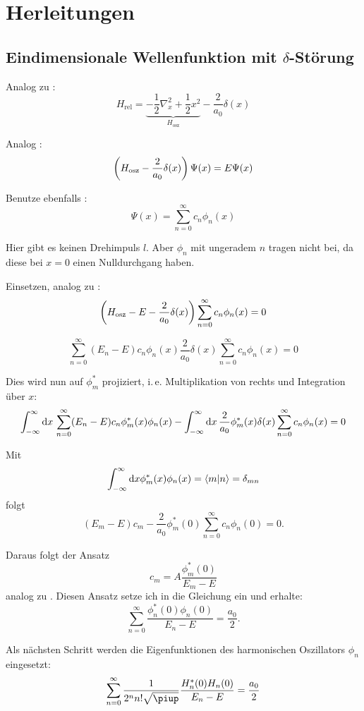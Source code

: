 
\chapter{Herleitungen}

\section{Eindimensionale Wellenfunktion mit $\delta$-Störung}

\newcommand\br[1]{\parencite[(#1)]{Busch/Two_Cold}}

Analog zu \br2:
\[
    H_\text{rel} =
    \underbrace{- \frac12 \nabla_x^2 + \frac 12 x^2}_{H_\text{osz}} - \frac2{a_0} \delta(x)
\]

Analog \br3:
\[
    \del{H_\text{osz} - \frac2{a_0} \delta(x)} \Psi(x) = E \Psi(x)
\]

Benutze ebenfalls \br4:
\[
    \Psi(x) = \sum_{n=0}^\infty c_n \phi_n(x)
\]

Hier gibt es keinen Drehimpuls $l$. Aber $\phi_n$ mit ungeradem $n$ tragen
nicht bei, da diese bei $x = 0$ einen Nulldurchgang haben.

Einsetzen, analog zu \br5:
\[
    \del{H_\text{osz} - E - \frac2{a_0} \delta(x)}
    \sum_{n=0}^\infty c_n \phi_n(x)
    = 0
\]

\[
    \sum_{n=0}^\infty (E_n - E) c_n \phi_n(x)
    \frac2{a_0} \delta(x)
    \sum_{n=0}^\infty c_n \phi_n(x)
    = 0
\]

Dies wird nun auf $\phi_m^*$ projiziert, i.\,e. Multiplikation von rechts und
Integration über $x$:
\[
    \int_{-\infty}^\infty \dif x \, \sum_{n=0}^\infty
    (E_n - E) c_n \phi_m^*(x) \phi_n(x)
    - 
    \int_{-\infty}^\infty \dif x \,  \frac2{a_0} \phi_m^*(x) \delta(x)
    \sum_{n=0}^\infty c_n \phi_n(x) = 0
\]

Mit
\[
    \int_{-\infty}^\infty \dif x \phi_m^*(x) \phi_n(x) = \braket{m|n} =
    \delta_{mn}
\]
folgt
\[
    (E_m - E) c_m - \frac2{a_0} \phi_m^*(0) \sum_{n=0}^\infty c_n \phi_n(0) =
    0.
\]

Daraus folgt der Ansatz
\[
    c_m = A \frac{\phi_m^*(0)}{E_m - E}
\]
analog zu \br7. Diesen Ansatz setze ich in die Gleichung ein und erhalte:
\[
    \sum_{n=0}^\infty \frac{\phi_n^*(0) \phi_n(0)}{E_n - E} = \frac{a_0}2.
\]

Als nächsten Schritt werden die Eigenfunktionen des harmonischen Oszillators
$\phi_n$ eingesetzt:
\[
    \sum_{n=0}^\infty \frac{1}{2^n n! \sqrt\piup} \frac{H_n^*(0) H_n(0)}{E_n -
    E} = \frac{a_0}2
\]

